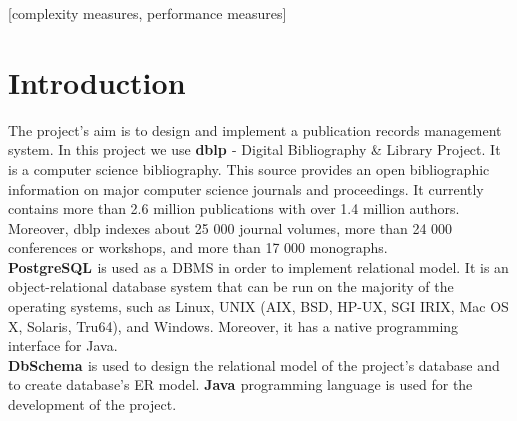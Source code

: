 \documentclass{acm_proc_article-sp}
\begin{document}
[complexity measures, performance measures]



\section{Introduction}
The project's aim is to design and implement a publication records management system. In this project we use {\bfseries dblp \cite{dblp}} - Digital Bibliography \& Library Project. It is a computer science bibliography. This source provides an open bibliographic information on major computer science journals and proceedings. It currently contains more than 2.6 million publications with over 1.4 million authors. Moreover, dblp indexes about 25 000 journal volumes, more than 24 000 conferences or workshops, and more than 17 000 monographs.\\
{\bfseries PostgreSQL \cite{postgresql}} is used as a DBMS in order to implement relational model. It is an object-relational database system that can be run on the majority of the operating systems, such as Linux, UNIX (AIX, BSD, HP-UX, SGI IRIX, Mac OS X, Solaris, Tru64), and Windows. Moreover, it has a native programming interface for Java.\\
{\bfseries DbSchema \cite{dbschema}} is used to design the relational model of the project's database and to create database's ER model.
{\bfseries Java \cite{java}} programming language is used for the development of the project.
\end{document}
